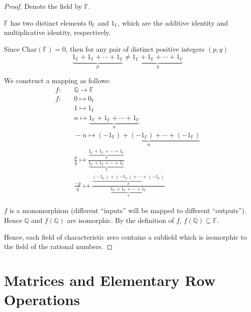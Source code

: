 \begin{proof}
    Denote the field by $\mathbb{F}$.

    $\mathbb{F}$ has two distinct elements $0_{\mathbb{F}}$ and $1_{\mathbb{F}}$, which are the additive identity and multiplicative identity, respectively.

    Since $\text{Char}(\mathbb{F}) = 0$, then for any pair of distinct positive integers $(p, q)$
    \[
        \underbrace{1_{\mathbb{F}} + 1_{\mathbb{F}} + \cdots + 1_{\mathbb{F}}}_{p} \ne \underbrace{1_{\mathbb{F}} + 1_{\mathbb{F}} + \cdots + 1_{\mathbb{F}}}_{q}
    \]

    We construct a mapping as follows:
    \[
        \begin{split}
            f:&\quad\mathbb{Q} \to \mathbb{F} \\
            f:&\quad 0 \mapsto 0_{\mathbb{F}} \\
            &\quad 1 \mapsto 1_{\mathbb{F}} \\
            &\quad n \mapsto \underbrace{1_{\mathbb{F}} + 1_{\mathbb{F}} + \cdots + 1_{\mathbb{F}}}_{n} \\
            &\quad -n \mapsto \underbrace{(-1_{\mathbb{F}}) + (-1_{\mathbb{F}}) + \cdots + (-1_{\mathbb{F}})}_{n} \\
            &\quad \frac{p}{q} \mapsto \frac{\underbrace{1_{\mathbb{F}} + 1_{\mathbb{F}} + \cdots + 1_{\mathbb{F}}}_{p}}{\underbrace{1_{\mathbb{F}} + 1_{\mathbb{F}} + \cdots + 1_{\mathbb{F}}}_{q}} \\
            &\quad \frac{-p}{q} \mapsto \frac{\underbrace{(-1_{\mathbb{F}}) + (-1_{\mathbb{F}}) + \cdots + (-1_{\mathbb{F}})}_{p}}{\underbrace{1_{\mathbb{F}} + 1_{\mathbb{F}} + \cdots + 1_{\mathbb{F}}}_{q}}
        \end{split}
    \]

    $f$ is a monomorphism (different ``inputs'' will be mapped to different ``outputs''). Hence $\mathbb{Q}$ and $f(\mathbb{Q})$ are isomorphic. By the definition of $f$, $f(\mathbb{Q})\subseteq\mathbb{F}$.

    Hence, each field of characteristic zero contains a subfield which is isomorphic to the field of the rational numbers.
\end{proof}

\section{Matrices and Elementary Row Operations}

\setcounter{exercise}{0}

